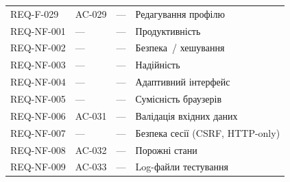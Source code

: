 \begin{longtable}{L{2.8cm} L{3.2cm} L{2.5cm} L{5.5cm}}
REQ-F-029 & AC-029 & --- & Редагування профілю \\
REQ-NF-001 & --- & --- & Продуктивність \\
REQ-NF-002 & --- & --- & Безпека~/ хешування \\
REQ-NF-003 & --- & --- & Надійність \\
REQ-NF-004 & --- & --- & Адаптивний інтерфейс \\
REQ-NF-005 & --- & --- & Сумісність браузерів \\
REQ-NF-006 & AC-031 & --- & Валідація вхідних даних \\
REQ-NF-007 & --- & --- & Безпека сесії (CSRF, HTTP-only) \\
REQ-NF-008 & AC-032 & --- & Порожні стани \\
REQ-NF-009 & AC-033 & --- & Log-файли тестування \\

\end{longtable}
